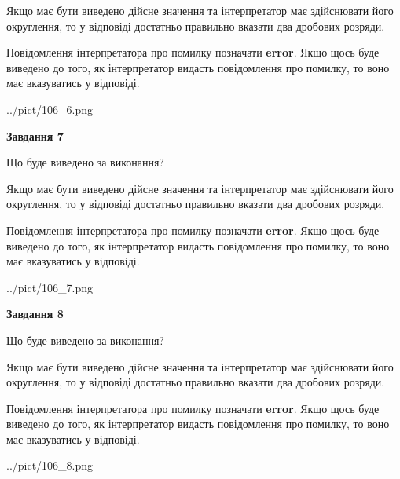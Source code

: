\documentclass[12pt, ukrainian]{article}
\begin{document}
{\begin {Large}
Якщо має бути виведено дійсне значення та інтерпретатор має здійснювати його округлення, 
то у відповіді достатньо правильно вказати два дробових розряди.

Повідомлення інтерпретатора про помилку позначати \textbf{error}.
Якщо щось буде виведено до того, як інтерпретатор видасть повідомлення про помилку, 
то воно має вказуватись у відповіді. \par

\begin{center}
	{../pict/106_6.png}
\end{center}
\newpage

{\begin {center}\textbf{Завдання 7}\end {center}}\par
Що буде виведено за виконання? \par

Якщо має бути виведено дійсне значення та інтерпретатор має здійснювати його округлення, 
то у відповіді достатньо правильно вказати два дробових розряди.

Повідомлення інтерпретатора про помилку позначати \textbf{error}.
Якщо щось буде виведено до того, як інтерпретатор видасть повідомлення про помилку, 
то воно має вказуватись у відповіді. \par

\begin{center}
	{../pict/106_7.png}
\end{center}
\newpage

{\begin {center}\textbf{Завдання 8}\end {center}}\par
Що буде виведено за виконання? \par

Якщо має бути виведено дійсне значення та інтерпретатор має здійснювати його округлення, 
то у відповіді достатньо правильно вказати два дробових розряди.

Повідомлення інтерпретатора про помилку позначати \textbf{error}.
Якщо щось буде виведено до того, як інтерпретатор видасть повідомлення про помилку, 
то воно має вказуватись у відповіді. \par

\begin{center}
	{../pict/106_8.png}
\end{center}
\newpage


\end{Large}}
\end{document}
